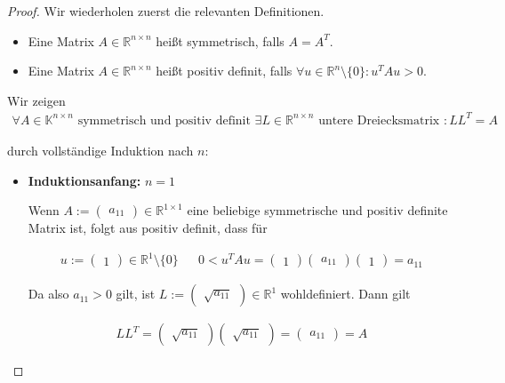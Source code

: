 \documentclass[titlepage]{article}
\begin{document}
\begin{proof}
	Wir wiederholen zuerst die relevanten Definitionen.
	
	\begin{itemize}
		\item Eine Matrix $A \in \mathbb{R}^{n\times n}$ heißt symmetrisch, falls $A = A^T$.
		\item Eine Matrix $A \in \mathbb{R}^{n\times n}$ heißt positiv definit, falls $\forall u \in \mathbb{R}^n\setminus\{0\}: u^T A u > 0$.
	\end{itemize}

	Wir zeigen
	\begin{align*}
		\forall A \in \mathbb{K}^{n\times n} \text{ symmetrisch und positiv definit } \exists L \in \mathbb{R}^{n\times n} \text{ untere Dreiecksmatrix } : LL^T=A
	\end{align*}
	
	 durch vollständige Induktion nach $n$:
	
	\begin{itemize}
		\item \textbf{Induktionsanfang:} $n=1$
		
		Wenn $A := \begin{pmatrix}
			a_{11}
		\end{pmatrix} \in \mathbb{R}^{1\times 1}$ eine beliebige symmetrische und positiv definite Matrix ist, folgt aus positiv definit, dass für
	
		\begin{align*}
			u := \begin{pmatrix}
				1
			\end{pmatrix} \in \mathbb{R}^1 \setminus\{0\} && 0 < u^TAu = \begin{pmatrix}
				1
			\end{pmatrix} \begin{pmatrix}
				a_{11}
			\end{pmatrix} \begin{pmatrix}
				1
			\end{pmatrix} = a_{11}
		\end{align*}
	
		Da also $a_{11} > 0$ gilt, ist $L := \begin{pmatrix}
			\sqrt{a_{11}}
		\end{pmatrix} \in \mathbb{R}^{1}$ wohldefiniert. Dann gilt
	
		\begin{align*}
			LL^T = \begin{pmatrix}
				\sqrt{a_{11}}
			\end{pmatrix} \begin{pmatrix}
				\sqrt{a_{11}}
			\end{pmatrix} = \begin{pmatrix}
				a_{11}
			\end{pmatrix} = A
		\end{align*}
	

\end{itemize}
\end{proof}
\end{document}
